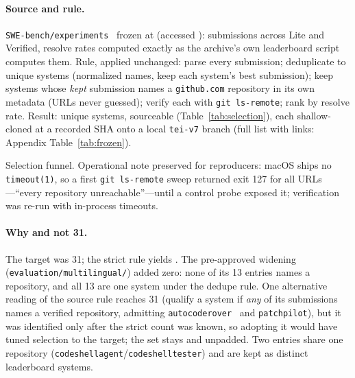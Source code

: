 \documentclass[11pt]{article}
\begin{document}
\paragraph{Source and rule.}
\texttt{SWE-bench/experiments}~\citep{swebenchexperiments} frozen at
\texttt{\swArchiveShort} (accessed \swAccessDate): \swSubs{} submissions
across Lite and Verified, resolve rates computed exactly as the archive's own
leaderboard script computes them. Rule, applied unchanged: parse every
submission; deduplicate to unique systems (normalized names, keep each
system's best submission); keep systems whose \emph{kept} submission names a
\texttt{github.com} repository in its own metadata (URLs never guessed);
verify each with \texttt{git ls-remote}; rank by resolve rate. Result:
\swUnique{} unique systems, \swN{} sourceable (Table~\ref{tab:selection}),
each shallow-cloned at a recorded SHA onto a local \texttt{tei-v7} branch
(full list with links: Appendix Table~\ref{tab:frozen}).

\begin{table}[t]\centering
\caption{Selection funnel. Operational note preserved for reproducers: macOS
ships no \texttt{timeout(1)}, so a first \texttt{git ls-remote} sweep returned
exit 127 for all URLs---``every repository unreachable''---until a control
probe exposed it; verification was re-run with in-process timeouts.}
\label{tab:selection}\footnotesize
\begin{adjustbox}{max width=\linewidth,center}\end{adjustbox}
\end{table}

\paragraph{Why \swN{} and not 31.}
The target was 31; the strict rule yields \swN. The pre-approved widening
(\texttt{evaluation/multilingual/}) added zero: none of its 13 entries names a
repository, and all 13 are one system under the dedupe rule. One alternative
reading of the source rule reaches 31 (qualify a system if \emph{any} of its
submissions names a verified repository, admitting
\texttt{autocoderover}~\citep{autocoderover2024} and \texttt{patchpilot}), but
it was identified only after the strict count was known, so adopting it would
have tuned selection to the target; the set stays \swN{} and unpadded. Two
entries share one repository (\texttt{codeshellagent}/\texttt{codeshelltester})
and are kept as distinct leaderboard systems.
\end{document}
